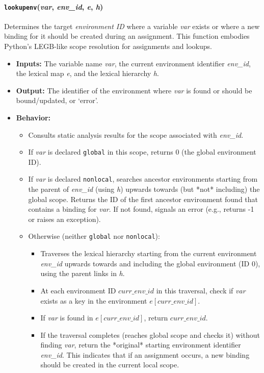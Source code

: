 \documentclass[runningheads]{llncs}
\begin{document}
\paragraph{\texttt{lookupenv}(\textit{var}, \textit{env\_id}, \textit{e}, \textit{h})}
Determines the target \textit{environment ID} where a variable \textit{var}
exists or where a new binding for it should be created during an assignment.
This function embodies Python's LEGB-like scope resolution for assignments and
lookups.
\begin{itemize}
	\item \textbf{Inputs:} The variable name \textit{var}, the current
	      environment identifier \textit{env\_id}, the lexical map \textit{e}, and the
	      lexical hierarchy \textit{h}.
	\item \textbf{Output:} The identifier of the environment where \textit{var}
	      is found or should be bound/updated, or `error'.
	\item \textbf{Behavior:}
	      \begin{itemize}
		      \item Consults static analysis results for the scope associated
		            with \textit{env\_id}.
		      \item If \textit{var} is declared \texttt{global} in this scope,
		            returns 0 (the global environment ID).
		      \item If \textit{var} is declared \texttt{nonlocal}, searches
		            ancestor environments starting from the parent of \textit{env\_id} (using
		            \textit{h}) upwards towards (but *not* including) the global scope. Returns the
		            ID of the first ancestor environment found that contains a binding for
		            \textit{var}. If not found, signals an error (e.g., returns -1 or raises an
		            exception).
		      \item Otherwise (neither \texttt{global} nor \texttt{nonlocal}):
		            \begin{itemize}
			            \item Traverses the lexical hierarchy starting from the
			                  current environment \textit{env\_id} upwards towards and including the global
			                  environment (ID 0), using the parent links in \textit{h}.
			            \item At each environment ID $curr\_env\_id$ in this
			                  traversal, check if \textit{var} exists as a key in the environment
			                  $e[curr\_env\_id]$.
			            \item If \textit{var} is found in $e[curr\_env\_id]$,
			                  return $curr\_env\_id$.
			            \item If the traversal completes (reaches global scope
			                  and checks it) without finding \textit{var}, return the *original* starting
			                  environment identifier \textit{env\_id}. This indicates that if an assignment
			                  occurs, a new binding should be created in the current local scope.
		            \end{itemize}
	      \end{itemize}
\end{itemize}
\end{document}
